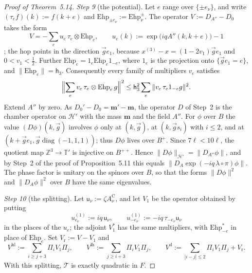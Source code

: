 \documentclass[11pt,letterpaper,reqno]{amsart}
\theoremstyle{definition}
\begin{document}
\begin{proof}[Proof of Theorem~5.14]
\emph{Step 9} (the potential).
Let $e$ range over $\{\pm e_\nu\}$, and write $(\tau_ef)(k):=f(k+e)$ and $\mathrm{Ehp}_{\pm e_\nu}:=\mathrm{Ehp}^\pm_\nu$.
The operator $V:=D_{A''}-D_0$ takes the form
\begin{equation*}
V=-\sum_eu_e\,\tau_e\otimes\mathrm{Ehp}_e,\qquad u_e(k):=\exp\bigl(iqA''(k,k+e)\bigr)-1
\end{equation*}
\cite[Definition~2.10]{QEDII};
the hop points in the direction $\vec ge_1$, because $x^{(3)}-x=(1-2v_1)\vec ge_1$ and $0<v_1<\frac12$.
Further $\mathrm{Ehp}_e=1_e\mathrm{Ehp}_e1_{-e}$, where $1_e$ is the projection onto $\{\vec ge_1=e\}$, and $\|\mathrm{Ehp}_e\|=\mathsf h_3$.
Consequently every family of multipliers $v_e$ satisfies
\begin{equation*}
\Bigl\|\sum_ev_e\,\tau_e\otimes\mathrm{Ehp}_e\,g\Bigr\|^2\le\mathsf h_3^2\sum_e\|v_e\,\tau_e1_{-e}g\|^2.
\end{equation*}
Extend $A''$ by zero.
As $D_0'-D_0=\mathbf m'-\mathbf m$, the operator $D$ of Step~2 is the chamber operator on $\mathcal H'$ with the mass $\mathbf m$ and the field $A''$.
For $\phi$ over $B$ the value $(D\phi)(k,\vec g)$ involves $\phi$ only at $(k,\vec g)$, at $(k,\vec gs_i)$ with $i\le2$, and at $(k+\vec ge_1,\vec g\operatorname{diag}(-1,1,1))$;
thus $D\phi$ lives over $B^+$.
Since $7\ell<10\ell$, the quotient map $\mathbb Z^3\to\mathbb T'$ is injective on $B^{++}$.
Hence $\|D\phi\|_{\mathcal H'}=\|D_{A''}\phi\|$, and by Step~2 of the proof of Proposition~5.11 this equals $\|D_A\exp(-iq\,\lambda\circ\pi)\phi\|$.
The phase factor is unitary on the spinors over $B$, so that the forms $\|D\phi\|^2$ and $\|D_A\phi\|^2$ over $B$ have the same eigenvalues.

\emph{Step 10} (the splitting).
Let $\mathsf u_\nu:=\zeta A^{\mathrm C}_\nu$, and let $V_1$ be the operator obtained by putting
\begin{equation*}
u^{(1)}_{e_\nu}:=iq\,\mathsf u_\nu,\qquad u^{(1)}_{-e_\nu}:=-iq\,\tau_{-e_\nu}\mathsf u_\nu
\end{equation*}
in the places of the $u_e$;
the adjoint $V_1^*$ has the same multipliers, with $\mathrm{Ehp}_{-e}^*$ in place of $\mathrm{Ehp}_e$.
Set $V_{\mathrm r}:=V-V_1$ and
\begin{equation*}
V^{\mathrm{hl}}:=\sum_{i\ge j+3}\Pi_iV_1\Pi_j,\qquad V^{\mathrm{lh}}:=\sum_{j\ge i+3}\Pi_iV_1\Pi_j,\qquad V^{\mathrm d}:=\sum_{|i-j|\le2}\Pi_iV_1\Pi_j+V_{\mathrm r}.
\end{equation*}
With this splitting, $\mathcal T$ is exactly quadratic in $F$.


\end{proof}
\end{document}

